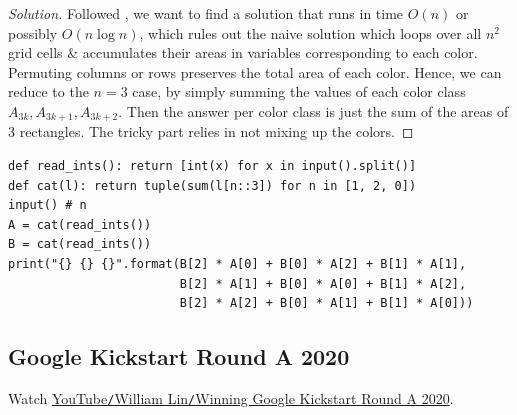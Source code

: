 \documentclass{article}
\begin{document}
\begin{proof}[Solution]
	Followed \cite[Sect. 1.8, pp. 39--41]{Durr_Vie2021}, we want to find a solution that runs in time $O(n)$ or possibly $O(n\log n)$, which rules out the naive solution which loops over all $n^2$ grid cells \& accumulates their areas in variables corresponding to each color. Permuting columns or rows preserves the total area of each color. Hence, we can reduce to the $n = 3$ case, by simply summing the values of each color class $A_{3k},A_{3k+1},A_{3k+2}$. Then the answer per color class is just the sum of the areas of 3 rectangles. The tricky part relies in not mixing up the colors.
\end{proof}

\begin{verbatim}
def read_ints(): return [int(x) for x in input().split()]
def cat(l): return tuple(sum(l[n::3]) for n in [1, 2, 0])
input() # n
A = cat(read_ints())
B = cat(read_ints())
print("{} {} {}".format(B[2] * A[0] + B[0] * A[2] + B[1] * A[1],
                        B[2] * A[1] + B[0] * A[0] + B[1] * A[2],
                        B[2] * A[2] + B[0] * A[1] + B[1] * A[0]))
\end{verbatim}



\subsection{Google Kickstart Round A 2020}
Watch \href{https://www.youtube.com/watch?v=uGrBHohIgQY}{YouTube\texttt{/}William Lin\texttt{/}Winning Google Kickstart Round A 2020}.
\end{document}
